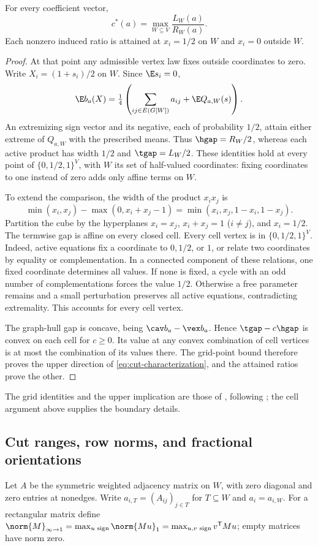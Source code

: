 \begin{lemma}\label{lem:induced-cut}
For every coefficient vector,
\begin{equation}\label{eq:cut-characterization}
 c^*(a)=\max_{W\subseteq V}\frac{L_W(a)}{R_W(a)}.
\end{equation}
Each nonzero induced ratio is attained at $x_i=1/2$ on $W$ and $x_i=0$
outside $W$.
\end{lemma}
\begin{proof}
At that point any admissible vertex law fixes outside coordinates to zero.
Write $X_i=(1+s_i)/2$ on $W$. Since $\E s_i=0$,
\[
 \E b_a(X)=\tfrac14\left(\sum_{ij\in E(G[W])}a_{ij}+\E Q_{a,W}(s)\right).
\]
An extremizing sign vector and its negative, each of probability $1/2$,
attain either extreme of $Q_{a,W}$ with the prescribed means. Thus
$\hgap=R_W/2$, whereas each active product has width $1/2$ and
$\tgap=L_W/2$. These identities hold at every point of
$\{0,1/2,1\}^V$, with $W$ its set of half-valued coordinates: fixing
coordinates to one instead of zero adds only affine terms on $W$.

To extend the comparison, the width of the product $x_ix_j$ is
\[
 \min(x_i,x_j)-\max(0,x_i+x_j-1)
 =\min(x_i,x_j,1-x_i,1-x_j).
\]
Partition the cube by the hyperplanes $x_i=x_j$, $x_i+x_j=1$ ($i\ne j$),
and $x_i=1/2$. The termwise gap is affine on every closed cell.
Every cell vertex is in $\{0,1/2,1\}^V$. Indeed, active equations fix a
coordinate to $0,1/2$, or $1$, or relate two coordinates by equality or
complementation. In a connected component of these relations, one fixed
coordinate determines all values. If none is fixed, a cycle with an odd
number of complementations forces the value $1/2$. Otherwise a free
parameter remains and a small perturbation preserves all active equations,
contradicting extremality. This accounts for every cell vertex.

The graph-hull gap is concave, being $\cav b_a-\vex b_a$. Hence
$\tgap-c\hgap$ is convex on each cell for $c\ge0$. Its value at any
convex combination of cell vertices is at most the combination of its
values there. The grid-point bound therefore proves the upper direction
of \eqref{eq:cut-characterization}, and the attained ratios prove the other.
\end{proof}
The grid identities and the upper implication are those of
\citet[Lemma 1 and Corollary 1]{Boland2017}, following \citet{Luedtke2012};
the cell argument above supplies the boundary details.

\subsection{Cut ranges, row norms, and fractional orientations}
Let $A$ be the symmetric weighted adjacency matrix on $W$, with zero
diagonal and zero entries at nonedges. Write $a_{i,T}=(A_{ij})_{j\in T}$
for $T\subseteq W$ and $a_i=a_{i,W}$. For a rectangular matrix define
$\norm{M}_{\infty\to1}=\max_{u\text{ sign}}\norm{Mu}_1
=\max_{u,v\text{ sign}}v^{\mathsf T}Mu$; empty matrices have norm zero.

